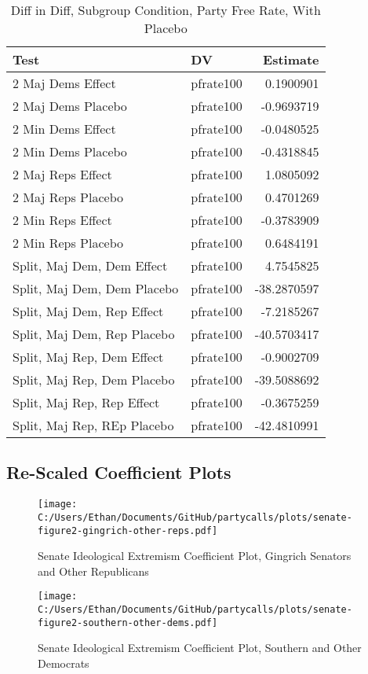 \documentclass[12pt]{article}
\begin{document}
\begin{table}[H]
	\centering
	\caption{Diff in Diff, Subgroup Condition, Party Free Rate, With Placebo}
	\begin{tabular}{llr}
		\hline
		Test & DV & Estimate \\ 
		\hline
		2 Maj Dems Effect & pfrate100 & 0.1900901 \\ 
		2 Maj Dems Placebo & pfrate100 & -0.9693719 \\ 
		\hline
		2 Min Dems Effect & pfrate100 & -0.0480525 \\ 
		2 Min Dems Placebo & pfrate100 & -0.4318845 \\ 
		\hline
		2 Maj Reps Effect & pfrate100 & 1.0805092 \\ 
		2 Maj Reps Placebo & pfrate100 & 0.4701269 \\ 
		\hline
		2 Min Reps Effect & pfrate100 & -0.3783909 \\ 
		2 Min Reps Placebo & pfrate100 & 0.6484191 \\ 
		\hline
		Split, Maj Dem, Dem Effect & pfrate100 & 4.7545825 \\ 
		Split, Maj Dem, Dem Placebo & pfrate100 & -38.2870597 \\ 
		\hline
		Split, Maj Dem, Rep Effect & pfrate100 & -7.2185267 \\ 
		Split, Maj Dem, Rep Placebo & pfrate100 & -40.5703417 \\ 
		\hline
		Split, Maj Rep, Dem Effect & pfrate100 & -0.9002709 \\ 
		Split, Maj Rep, Dem Placebo & pfrate100 & -39.5088692 \\ 
		\hline
		Split, Maj Rep, Rep Effect & pfrate100 & -0.3675259 \\ 
		Split, Maj Rep, REp Placebo & pfrate100 & -42.4810991 \\ 
		\hline
	\end{tabular}
\end{table}



\subsection{Re-Scaled Coefficient Plots}

\begin{figure}[H]
	\centering
	\caption{Senate Ideological Extremism Coefficient Plot, Gingrich Senators and Other Republicans}
	\texttt{[image: C:/Users/Ethan/Documents/GitHub/partycalls/plots/senate-figure2-gingrich-other-reps.pdf]}
\end{figure}

\begin{figure}[H]
	\centering
	\caption{Senate Ideological Extremism Coefficient Plot, Southern and Other Democrats}
	\texttt{[image: C:/Users/Ethan/Documents/GitHub/partycalls/plots/senate-figure2-southern-other-dems.pdf]}
\end{figure}
\end{document}
